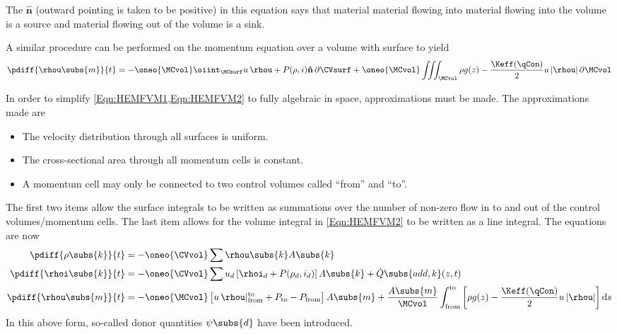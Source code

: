 The $\mathbf{\hat{n}}$ (outward pointing is taken to be positive) in this equation says that material material flowing into material flowing into the volume is a source and material flowing out of the volume is a sink.

A similar procedure can be performed on the momentum equation over a volume \MCvol with surface \MCsurf to yield 
\begin{equation}
    \pdiff{\rhou\subs{m}}{t}
    = -  
    \oneo{\MCvol}
                \oiint_{\MCsurf} u\,\rhou + P(\rho,i) \mathbf{\hat{n}}\,\partial\CVsurf +
    \oneo{\MCvol}\iiint_{\MCvol} \rho{g(z)} - \frac{\Keff(\qCon)}{2} u\,|\rhou| \,\partial\MCvol
    \label{Eqn:HEMFVM2}
\end{equation}

In order to simplify \cref{Eqn:HEMFVM1,Eqn:HEMFVM2} to fully algebraic in space, approximations must be made.
The approximations made are 
\begin{itemize}
    \item{The velocity distribution through all surfaces is uniform.}
    \item{The cross-sectional area through all momentum cells is constant.}
    \item{A momentum cell may only be connected to two control volumes called ``from'' and ``to''.}
\end{itemize}
The first two items allow the surface integrals to be written as summations over the number of non-zero flow in to and out of the control volumes/momentum cells.
The last item allows for the volume integral in \cref{Eqn:HEMFVM2} to be written as a line integral.
The equations are now
\begin{subequations}\label{Eqn:Semidiscrete1}
\begin{align}
    \pdiff{\rho\subs{k}}{t}  &= - \oneo{\CVvol}\sum{\rhou\subs{k} A\subs{k}}\\
    \pdiff{\rhoi\subs{k}}{t} &= - \oneo{\CVvol}\sum{u_d\left[\rhoi_d  + P(\rho_d,i_d)\right] A\subs{k}} + \dot{Q}\subs{add,k}(z,t) \\
    \pdiff{\rhou\subs{m}}{t} &= - \oneo{\MCvol}\left[u\,\rhou\rvert^\text{to}_\text{from} + P_\text{to} - P_\text{from}\right]A\subs{m} + 
                                  \frac{A\subs{m}}{\MCvol}
                                   \int_{\text{from}}^{\text{to}}\left[\rho{g(z)} - \frac{\Keff(\qCon)}{2} u\,|\rhou|\right] \mathrm{d}s
\end{align}
\end{subequations}
In this above form, so-called donor quantities $\psi\subs{d}$ have been introduced.
